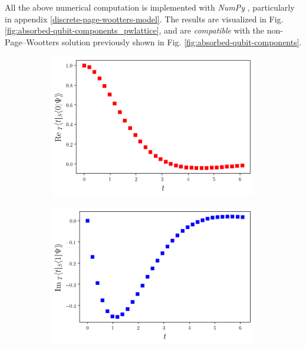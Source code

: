 All the above numerical computation is implemented with \emph{NumPy} \parencite{comp:numpy},
particularly in appendix
\ref{discrete-page-wootters-model}.
The results are visualized in
Fig. \ref{fig:absorbed-qubit-components_pwlattice},
and are \emph{compatible} with the non-Page--Wootters
solution previously shown in Fig. \ref{fig:absorbed-qubit-components}.

\begin{figure}
  \centering
  \begin{subfigure}[b]{0.49\textwidth}
    \includegraphics[width=\linewidth]{img/2ldetect/re_psi0_t_pwlattice.png}
    \subcaption{}\label{fig:absorbed-qubit-components_pwlattice:re0}
  \end{subfigure}
  \begin{subfigure}[b]{0.49\textwidth}
    \includegraphics[width=\linewidth]{img/2ldetect/im_psi1_t_pwlattice.png}

\end{subfigure}
\end{figure}
